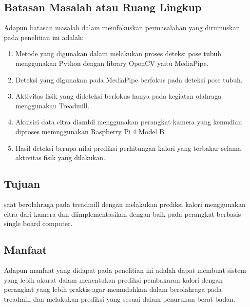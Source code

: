 \subsection{Batasan Masalah atau Ruang Lingkup}

Adapun batasan masalah dalam memfokuskan permasalahan yang dirumuskan pada penelitian ini adalah:

\begin{enumerate}[nolistsep]

    \item Metode yang digunakan dalam melakukan proses deteksi pose tubuh menggunakan Python dengan library OpenCV yaitu MediaPipe.
  
    \item Deteksi yang digunakan pada MediaPipe berfokus pada deteksi pose tubuh.
  
    \item Aktivitas fisik yang dideteksi berfokus hanya pada kegiatan olahraga menggunakan Treadmill.
    
    \item Akuisisi data citra diambil menggunakan perangkat kamera yang kemudian diproses memnggunakan Raspberry Pi 4 Model B.
    
    \item Hasil deteksi berupa nilai prediksi perhitungan kalori yang terbakar selama aktivitas fisik yang dilakukan.
  
  \end{enumerate}

\subsection{Tujuan}

saat berolahraga pada treadmill dengan melakukan prediksi kalori menggunakan citra dari kamera dan diimplementasikan dengan baik pada perangkat berbasis single board computer.

\subsection{Manfaat}

Adapun manfaat yang didapat pada penelitian ini adalah dapat membuat sistem yang lebih akurat dalam menentukan prediksi pembakaran kalori dengan perangkat yang lebih praktis agar memudahkan dalam berolahraga pada treadmill dan melakukan prediksi yang sesuai dalam penurunan berat badan.
